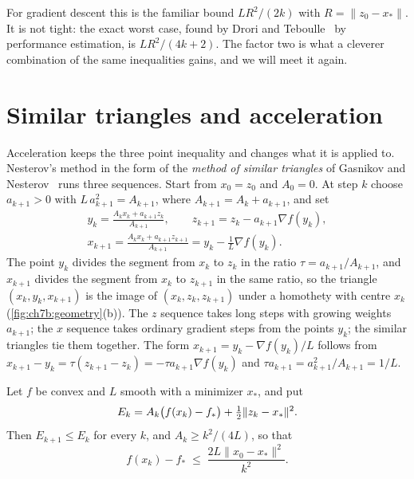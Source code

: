 For gradient descent this is the familiar bound $LR^2/(2k)$ with
$R=\|z_0-x_*\|$. It is not tight: the exact worst case, found by Drori and
Teboulle~\cite{drori2014} by performance estimation, is $LR^2/(4k+2)$. The factor
two is what a cleverer combination of the same inequalities gains, and we will
meet it again.

\section{Similar triangles and acceleration}\label{sec:ch7b:triangles}

Acceleration keeps the three point inequality and changes what it is
applied to. Nesterov's method in the form of the \emph{method of similar
triangles} of Gasnikov and Nesterov~\cite{gasnikov2018} runs three sequences.
Start from $x_0=z_0$ and $A_0=0$. At step $k$ choose $a_{k+1}>0$ with
$L\,a_{k+1}^2=A_{k+1}$, where $A_{k+1}=A_k+a_{k+1}$, and set
\begin{gather*}
  y_k=\frac{A_kx_k+a_{k+1}z_k}{A_{k+1}},\qquad
  z_{k+1}=z_k-a_{k+1}\nabla f(y_k),\\
  x_{k+1}=\frac{A_kx_k+a_{k+1}z_{k+1}}{A_{k+1}}=y_k-\frac1L\nabla f(y_k).
\end{gather*}
The point $y_k$ divides the segment from $x_k$ to $z_k$ in the ratio
$\tau=a_{k+1}/A_{k+1}$, and $x_{k+1}$ divides the segment from $x_k$ to $z_{k+1}$
in the same ratio, so the triangle $(x_k,y_k,x_{k+1})$ is the image of
$(x_k,z_k,z_{k+1})$ under a homothety with centre $x_k$
(\cref{fig:ch7b:geometry}(b)). The $z$ sequence takes long steps with growing
weights $a_{k+1}$; the $x$ sequence takes ordinary gradient steps from the
points $y_k$; the similar triangles tie them together. The form
$x_{k+1}=y_k-\nabla f(y_k)/L$ follows from
$x_{k+1}-y_k=\tau(z_{k+1}-z_k)=-\tau a_{k+1}\nabla f(y_k)$ and
$\tau a_{k+1}=a_{k+1}^2/A_{k+1}=1/L$.

\begin{theorem}\label{thm:ch7b:triangles}
Let $f$ be convex and $L$ smooth with a minimizer $x_*$, and put
\[
  E_k=A_k\bigl(f(x_k)-f_*\bigr)+\tfrac{1}{2}\|z_k-x_*\|^2.
\]
Then $E_{k+1}\le E_k$ for every $k$, and $A_k\ge k^2/(4L)$, so that
\[
  f(x_k)-f_*\;\le\;\frac{2L\|x_0-x_*\|^2}{k^2}.
\]
\end{theorem}

